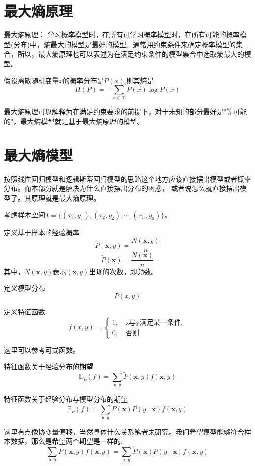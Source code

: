 \documentclass{article}
\begin{document}
    \setcounter{section}{0}
    \section{最大熵原理}
        最大熵原理：
        学习概率模型时，在所有可学习概率模型时，在所有可能的概率模型(分布)中，熵最大的模型是最好的模型。通常用约束条件来确定概率模型的集合，所以，最大熵原理也可以表述为在满足约束条件的模型集合中选取熵最大的模型。

        假设离散随机变量$x$的概率分布是$P(x)$,则其熵是
        \[H(P)=-\sum_{x\in\mathcal{X}}P(x)\log P(x)\]

        最大熵原理可以解释为在满足约束要求的前提下，对于未知的部分最好是"等可能的"。最大熵模型就是基于最大熵原理的模型。

    \section{最大熵模型}
        按照线性回归模型和逻辑斯蒂回归模型的思路这个地方应该直接摆出模型或者概率分布。而本部分就是解决为什么直接摆出分布的困惑，
        或者说怎么就直接摆出模型了。其原理就是最大熵原理。

        考虑样本空间$T=\{(x_1,y_1),(x_2,y_2),\cdots,(x_n,y_n)\}$。

        定义基于样本的经验概率
        \[\widetilde{P}(\boldsymbol{x},y)=\frac{N(\boldsymbol{x},y)}{n} \]
        \[\widetilde{P}(\boldsymbol{x})=\frac{N(\boldsymbol{x})}{n} \]
        其中，$N(\boldsymbol{x},y)$表示$(\boldsymbol{x},y)$出现的次数，即频数。

        定义模型分布
        \[P(x,y)\]

        定义特征函数
        \[f(x,y)=
        \begin{cases}
            1,\quad \text{x与y满足某一条件},\\
            0,\quad \text{否则}
        \end{cases}
        \]

        这里可以参考可式函数。

        特征函数关于经验分布的期望
        \[\mathbb{E}_{\widetilde{P}}(f)=\sum_{\boldsymbol{x},y}\widetilde{P}(\boldsymbol{x},y)f(\boldsymbol{x},y)\]

        特征函数关于经验分布与模型分布的期望
        \[\mathbb{E}_{P}(f)=\sum_{\boldsymbol{x},y}\widetilde{P}(\boldsymbol{x})P(y\mid\boldsymbol{x})f(\boldsymbol{x},y)\]

        这里有点像协变量偏移，当然具体什么关系笔者未研究。我们希望模型能够符合样本数据，那么是希望两个期望是一样的:
        \[\sum_{\boldsymbol{x},y}\widetilde{P}(\boldsymbol{x},y)f(\boldsymbol{x},y)=\sum_{\boldsymbol{x},y}\widetilde{P}(\boldsymbol{x})P(y\mid\boldsymbol{x})f(\boldsymbol{x},y)\]
\end{document}

